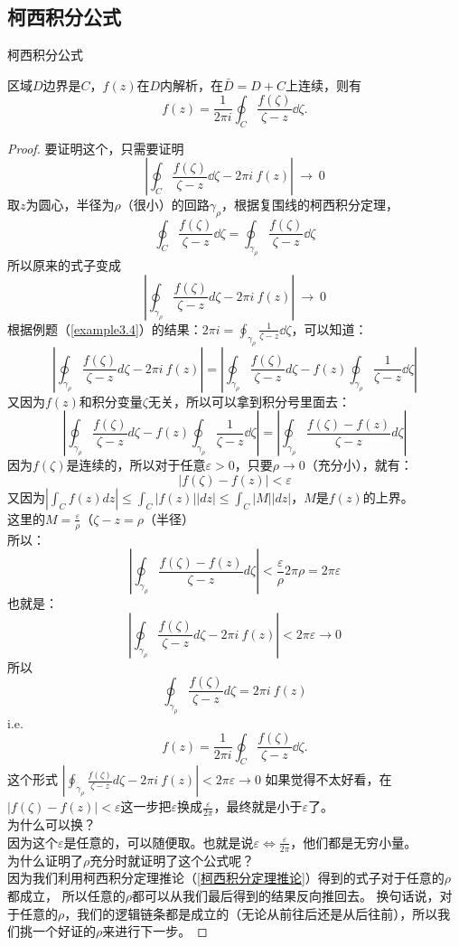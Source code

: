 \documentclass[cn,hazy,blue,14pt,normal]{elegantnote}
\numberwithin{equation}{section}
\begin{document}
\subsection{柯西积分公式}
\begin{definition}
	柯西积分公式
\end{definition}
区域$D$边界是$C$，$f(z)$在$D$内解析，在$\bar{D}=D+C$上连续，则有
\begin{equation}\label{柯西积分公式}
f(z) = \frac{1}{2\pi i} \oint_C \frac{f(\zeta)}{\zeta - z} \dd\zeta.
\end{equation}
\begin{proof}
要证明这个，只需要证明
$$\left|  \oint_C \frac{f(\zeta)}{\zeta - z} \dd\zeta - 2\pi i~f(z) \right|~\to~0$$
取$z$为圆心，半径为$\rho$（很小）的回路$\gamma_\rho$，根据复围线的柯西积分定理，
$$
\oint_C \frac{f(\zeta)}{\zeta - z} \dd \zeta
= \oint_{\gamma_\rho} \frac{f(\zeta)}{\zeta - z} \dd \zeta
$$
所以原来的式子变成
$$\left|\oint_{\gamma_\rho} \frac{f(\zeta)}{\zeta - z} d\zeta - 2\pi i~f(z)  \right|~\to~0$$
根据例题（\ref{example3.4}）的结果：$2\pi i = \oint_{\gamma_\rho}\frac{1}{\zeta - z} \dd \zeta$，可以知道：
$$
\left|\oint_{\gamma_\rho} \frac{f(\zeta)}{\zeta - z} d\zeta - 2\pi i~f(z)  \right| 
= \left|\oint_{\gamma_\rho} \frac{f(\zeta)}{\zeta - z} d\zeta - f(z)\oint_{\gamma_\rho}\frac{1}{\zeta - z} \dd \zeta  \right|
$$
又因为$f(z)$和积分变量$\zeta$无关，所以可以拿到积分号里面去：
$$
\left|\oint_{\gamma_\rho} \frac{f(\zeta)}{\zeta - z} d\zeta - f(z)\oint_{\gamma_\rho}\frac{1}{\zeta - z} \dd \zeta  \right|
= \left|\oint_{\gamma_\rho} \frac{f(\zeta) - f(z)}{\zeta - z} d\zeta \right| 
$$
因为$f(\zeta)$是连续的，所以对于任意$\varepsilon>0$，只要$\rho \to 0$（充分小），就有：
$$ \left | f(\zeta)-f(z) \right | < \varepsilon $$
又因为$|\int_C f(z) dz | \leqslant \int_C |f(z)| |dz| \leqslant \int_C |M| |dz|$，$M$是$f(z)$的上界。\\
这里的$M = \frac \varepsilon \rho$（$\zeta - z = \rho$（半径）\\
所以：
$$ \left|\oint_{\gamma_\rho} \frac{f(\zeta) - f(z)}{\zeta - z} d\zeta \right| < \frac \varepsilon \rho 2\pi \rho = 2 \pi \varepsilon $$
也就是：
$$ \left|\oint_{\gamma_\rho} \frac{f(\zeta)}{\zeta - z} d\zeta - 2\pi i~f(z)  \right| < 2\pi\varepsilon \to 0$$
所以
$$\oint_{\gamma_\rho} \frac{f(\zeta)}{\zeta - z} d\zeta = 2\pi i~f(z)$$
i.e.
$$ f(z) = \frac{1}{2\pi i} \oint_C \frac{f(\zeta)}{\zeta - z} \dd\zeta.$$
这个形式
$ \left|\oint_{\gamma_\rho} \frac{f(\zeta)}{\zeta - z} d\zeta - 2\pi i~f(z)  \right| < 2\pi\varepsilon \to 0$
如果觉得不太好看，在$ \left | f(\zeta)-f(z) \right | < \varepsilon $这一步把$\varepsilon$换成$\frac{\varepsilon}{2\pi}$，最终就是小于$\varepsilon$了。
\\为什么可以换？\\
因为这个$\varepsilon$是任意的，可以随便取。也就是说$\varepsilon \Leftrightarrow \frac{\varepsilon}{2\pi}$，他们都是无穷小量。\\
为什么证明了$\rho$充分时就证明了这个公式呢？\\因为我们利用柯西积分定理推论（\ref{柯西积分定理推论}）得到的式子对于任意的$\rho$都成立，
所以任意的$\rho$都可以从我们最后得到的结果反向推回去。
换句话说，对于任意的$\rho$，我们的逻辑链条都是成立的（无论从前往后还是从后往前），所以我们挑一个好证的$\rho$来进行下一步。
\end{proof}
\end{document}
